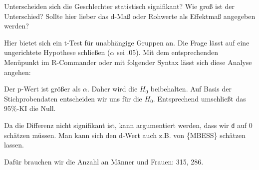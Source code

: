 \documentclass[12pt,ngerman,]{book}
\makeatletter
\newenvironment{Shaded}{\begin{snugshade}}{\end{snugshade}}
\newcommand{\KeywordTok}[1]{\textcolor[rgb]{0.13,0.29,0.53}{\textbf{#1}}}
\newcommand{\DataTypeTok}[1]{\textcolor[rgb]{0.13,0.29,0.53}{#1}}
\newcommand{\DecValTok}[1]{\textcolor[rgb]{0.00,0.00,0.81}{#1}}
\newcommand{\StringTok}[1]{\textcolor[rgb]{0.31,0.60,0.02}{#1}}
\newcommand{\CommentTok}[1]{\textcolor[rgb]{0.56,0.35,0.01}{\textit{#1}}}
\newcommand{\OperatorTok}[1]{\textcolor[rgb]{0.81,0.36,0.00}{\textbf{#1}}}
\newcommand{\NormalTok}[1]{#1}
\newenvironment{kframe}{%
\medskip{}
\setlength{\fboxsep}{.8em}
 \def\at@end@of@kframe{}%
 \ifinner\ifhmode%
  \def\at@end@of@kframe{\end{minipage}}%
  \begin{minipage}{\columnwidth}%
 \fi\fi%
 \def\FrameCommand##1{\hskip\@totalleftmargin \hskip-\fboxsep
 \colorbox{shadecolor}{##1}\hskip-\fboxsep
     \hskip-\linewidth \hskip-\@totalleftmargin \hskip\columnwidth}%
 \MakeFramed {\advance\hsize-\width
   \@totalleftmargin\z@ \linewidth\hsize
   \@setminipage}}%
 {\par\unskip\endMakeFramed%
 \at@end@of@kframe}
\renewenvironment{Shaded}{\begin{kframe}}{\end{kframe}}
\theoremstyle{definition}
\theoremstyle{definition}
\theoremstyle{remark}
\makeatother
\begin{document}
Unterscheiden sich die Geschlechter statistisch signifikant? Wie groß
ist der Unterschied? Sollte hier lieber das d-Maß oder Rohwerte als
Effektmaß angegeben werden?

Hier bietet sich ein t-Test für unabhängige Gruppen an. Die Frage lässt
auf eine ungerichtete Hypothese schließen (\(\alpha\) sei .05). Mit dem
entsprechenden Menüpunkt im R-Commander oder mit folgender Syntax lässt
sich diese Analyse angehen:

\begin{Shaded}
\end{Shaded}

Der p-Wert ist größer als \(\alpha\). Daher wird die \(H_0\)
beibehalten. Auf Basis der Stichprobendaten entscheiden wir uns für die
\(H_0\). Entsprechend umschließt das 95\%-KI die Null.

Da die Differenz nicht signifikant ist, kann argumentiert werden, dass
wir \texttt{d} auf 0 schätzen müssen. Man kann sich den d-Wert auch z.B.
von \{MBESS\} schätzen lassen.

Dafür brauchen wir die Anzahl an Männer und Frauen: 315, 286.

\begin{Shaded}
\end{Shaded}
\end{document}
